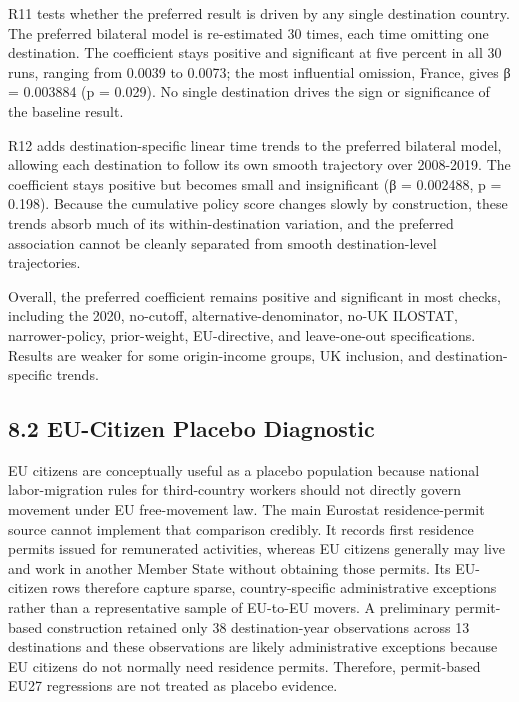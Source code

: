 \documentclass[11pt,a4paper]{article}
\begin{document}
R11 tests whether the preferred result is driven by any single
destination country. The preferred bilateral model is re-estimated 30
times, each time omitting one destination. The coefficient stays
positive and significant at five percent in all 30 runs, ranging from
0.0039 to 0.0073; the most influential omission, France, gives β =
0.003884 (p = 0.029). No single destination drives the sign or
significance of the baseline result.

R12 adds destination-specific linear time trends to the preferred
bilateral model, allowing each destination to follow its own smooth
trajectory over 2008-2019. The coefficient stays positive but becomes
small and insignificant (β = 0.002488, p = 0.198). Because the
cumulative policy score changes slowly by construction, these trends
absorb much of its within-destination variation, and the preferred
association cannot be cleanly separated from smooth destination-level
trajectories.

Overall, the preferred coefficient remains positive and significant in
most checks, including the 2020, no-cutoff, alternative-denominator,
no-UK ILOSTAT, narrower-policy, prior-weight, EU-directive, and
leave-one-out specifications. Results are weaker for some origin-income
groups, UK inclusion, and destination-specific trends.

\subsection{8.2 EU-Citizen Placebo
Diagnostic}\label{eu-citizen-placebo-diagnostic}

EU citizens are conceptually useful as a placebo population because
national labor-migration rules for third-country workers should not
directly govern movement under EU free-movement law. The main Eurostat
residence-permit source cannot implement that comparison credibly. It
records first residence permits issued for remunerated activities,
whereas EU citizens generally may live and work in another Member State
without obtaining those permits. Its EU-citizen rows therefore capture
sparse, country-specific administrative exceptions rather than a
representative sample of EU-to-EU movers. A preliminary \mbox{permit-based}
construction retained only 38 destination-year observations across 13
destinations and these observations are likely administrative exceptions
because EU citizens do not normally need residence permits. Therefore,
permit-based EU27 regressions are not treated as placebo evidence.
\end{document}
